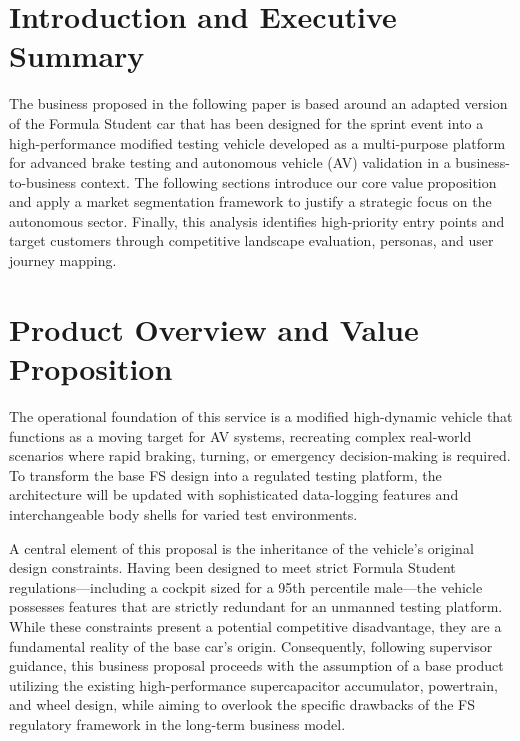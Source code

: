 \label{sec:market_and_competition}

\section{Introduction and Executive Summary}

The business proposed in the following paper is based around an adapted version of the Formula Student car that has been designed for the sprint event into a high-performance modified testing vehicle developed as a multi-purpose platform for advanced brake testing and autonomous vehicle (AV) validation in a business-to-business context. The following sections introduce our core value proposition and apply a market segmentation framework to justify a strategic focus on the autonomous sector. Finally, this analysis identifies high-priority entry points and target customers through competitive landscape evaluation, personas, and user journey mapping.

\section{Product Overview and Value Proposition}

The operational foundation of this service is a modified high-dynamic vehicle that functions as a moving target for AV systems, recreating complex real-world scenarios where rapid braking, turning, or emergency decision-making is required. To transform the base FS design into a regulated testing platform, the architecture will be updated with sophisticated data-logging features and interchangeable body shells for varied test environments.

A central element of this proposal is the inheritance of the vehicle's original design constraints. Having been designed to meet strict Formula Student regulations—including a cockpit sized for a 95th percentile male—the vehicle possesses features that are strictly redundant for an unmanned testing platform. While these constraints present a potential competitive disadvantage, they are a fundamental reality of the base car’s origin. Consequently, following supervisor guidance, this business proposal proceeds with the assumption of a base product utilizing the existing high-performance supercapacitor accumulator, powertrain, and wheel design, while aiming to overlook the specific drawbacks of the FS regulatory framework in the long-term business model.

